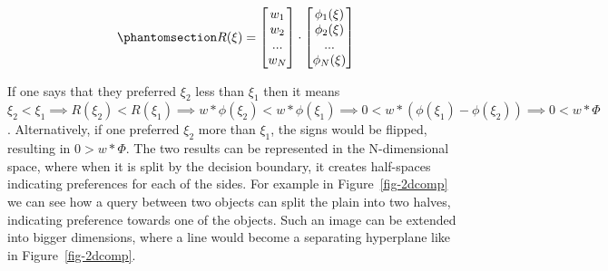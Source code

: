\documentclass[
  letterpaper,
  numbers=noenddot,
  DIV=11]{scrreprt}
\theoremstyle{definition}
\theoremstyle{plain}
\theoremstyle{plain}
\theoremstyle{remark}
\begin{document}
\begin{equation}\phantomsection\label{eq-reward_eq}{R(\xi) = \begin{bmatrix} w_1 \\ w_2 \\ ... \\ w_N \end{bmatrix} \cdot \begin{bmatrix} \phi_1(\xi) \\ \phi_2(\xi) \\ ... \\ \phi_N(\xi) \end{bmatrix}}\end{equation}

If one says that they preferred \(\xi_2\) less than \(\xi_1\) then it
means
\(\xi_2 < \xi_1 \implies R(\xi_2) < R(\xi_1) \implies w * \phi(\xi_2) < w * \phi(\xi_1) \implies 0 < w * (\phi(\xi_1) - \phi(\xi_2)) \implies 0 < w * \Phi\).
Alternatively, if one preferred \(\xi_2\) more than \(\xi_1\), the signs
would be flipped, resulting in \(0 > w * \Phi\). The two results can be
represented in the N-dimensional space, where when it is split by the
decision boundary, it creates half-spaces indicating preferences for
each of the sides. For example in Figure~\ref{fig-2dcomp} we can see how
a query between two objects can split the plain into two halves,
indicating preference towards one of the objects. Such an image can be
extended into bigger dimensions, where a line would become a separating
hyperplane like in Figure~\ref{fig-2dcomp}.
\end{document}
